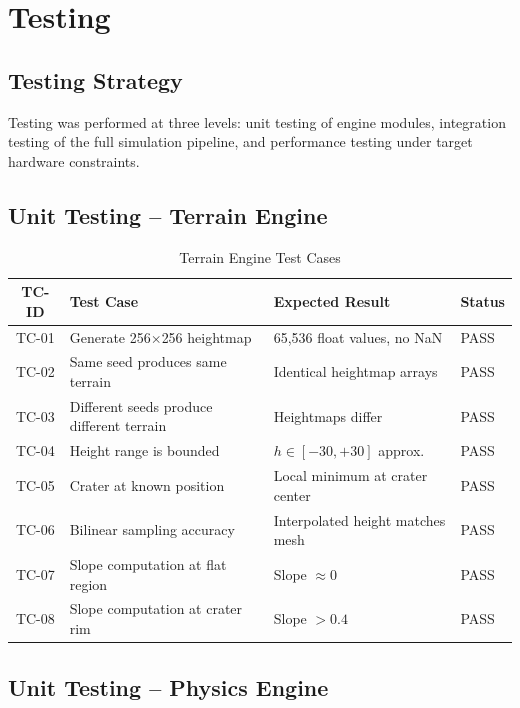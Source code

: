 \chapter{Testing}

\section{Testing Strategy}
Testing was performed at three levels: unit testing of engine modules, integration testing of the full simulation pipeline, and performance testing under target hardware constraints.

\section{Unit Testing -- Terrain Engine}

\begin{table}[h]
\centering
\caption{Terrain Engine Test Cases}
\label{tab:test_terrain}
\begin{tabular}{|c|p{4cm}|p{4cm}|p{3cm}|}
\hline
\textbf{TC-ID} & \textbf{Test Case} & \textbf{Expected Result} & \textbf{Status} \\
\hline
TC-01 & Generate 256$\times$256 heightmap & 65,536 float values, no NaN & \textcolor{green!60!black}{PASS} \\
\hline
TC-02 & Same seed produces same terrain & Identical heightmap arrays & \textcolor{green!60!black}{PASS} \\
\hline
TC-03 & Different seeds produce different terrain & Heightmaps differ & \textcolor{green!60!black}{PASS} \\
\hline
TC-04 & Height range is bounded & $h \in [-30, +30]$ approx. & \textcolor{green!60!black}{PASS} \\
\hline
TC-05 & Crater at known position & Local minimum at crater center & \textcolor{green!60!black}{PASS} \\
\hline
TC-06 & Bilinear sampling accuracy & Interpolated height matches mesh & \textcolor{green!60!black}{PASS} \\
\hline
TC-07 & Slope computation at flat region & Slope $\approx 0$ & \textcolor{green!60!black}{PASS} \\
\hline
TC-08 & Slope computation at crater rim & Slope $> 0.4$ & \textcolor{green!60!black}{PASS} \\
\hline
\end{tabular}
\end{table}

\section{Unit Testing -- Physics Engine}

